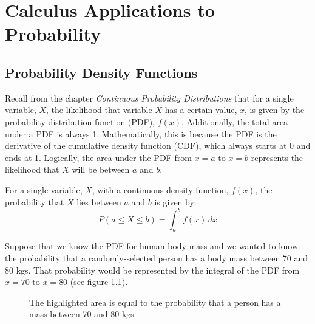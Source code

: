 \chapter{Calculus Applications to Probability}

\section{Probability Density Functions}
Recall from the chapter \textit{Continuous Probability Distributions} that for 
a single variable, $X$, the likelihood that variable $X$ has a certain value, 
$x$, is given by the probability distribution function (PDF), $f(x)$. 
Additionally, the total area under a PDF is always 1. Mathematically, this is 
because the PDF is the derivative of the cumulative density function (CDF), 
which always starts at 0 and ends at 1. Logically, the area under the PDF from 
$x = a$ to $x = b$ represents the likelihood that $X$ will be between $a$ and 
$b$. 

\begin{mdframed}[style = important, frametitle = {Probability that $X$ lies 
between $a$ and $b$}]
For a single variable, $X$, with a continuous density function, $f(x)$, the 
probability that $X$ lies between $a$ and $b$ is given by:
$$P( a \leq X \leq b) = \int_a^b f(x)\,dx$$
\end{mdframed}

Suppose that we know the PDF for human body mass and we wanted to know the 
probability that a randomly-selected person has a body mass between 70 and 80 
kgs. That probability would be represented by the integral of the PDF from $x 
= 70$ to $x = 80$ (see figure \ref{fig:mass_PDF}). 

\begin{figure}[htbp]
    \centering
    \caption{The highlighted area is equal to the probability that a person 
    has a mass between 70 and 80 kgs}
    \label{fig:mass_PDF}
\end{figure}

